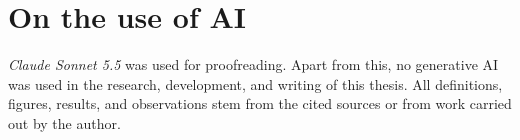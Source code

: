 \chapter*{On the use of AI}

\textit{Claude Sonnet 5.5} was used for proofreading. Apart from this, no generative AI was used in the research, development, and writing of this thesis. All definitions, figures, results, and observations stem from the cited sources or from work carried out by the author.
